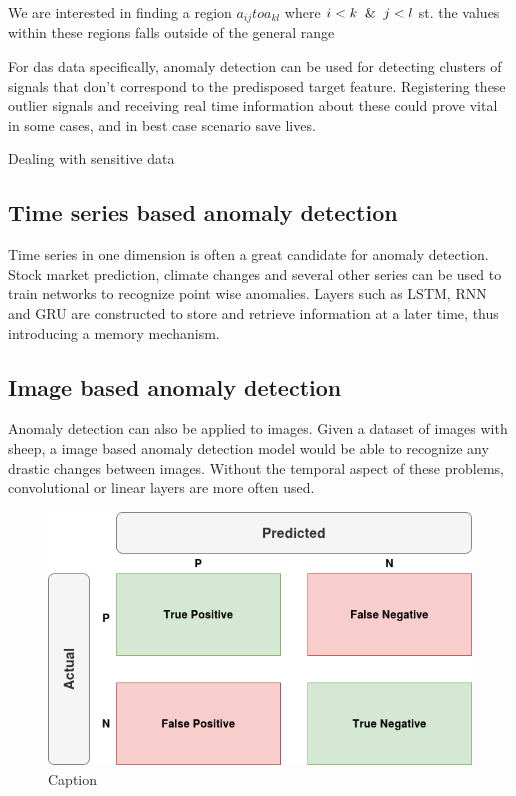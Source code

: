 We are interested in finding a region $a_{ij} to a_{kl}$ where $i < k \And j < l$ st. the values within these regions falls outside of the general range


For \acrshort{das} data specifically, anomaly detection can be used for detecting clusters of signals that don't correspond to the predisposed target feature. Registering these outlier signals and receiving real time information about these could prove vital in some cases,  and in best case scenario save lives. 

Dealing with sensitive data 

\subsection{Time series based anomaly detection}

Time series in one dimension is often a great candidate for anomaly detection. Stock market prediction, climate changes and several other series can be used to train networks to recognize point wise anomalies. Layers such as LSTM, RNN and GRU are constructed to store and retrieve information at a later time, thus introducing a memory mechanism. 

\subsection{Image based anomaly detection}

Anomaly detection can also be applied to images. Given a dataset of images with sheep, a image based anomaly detection model would be able to recognize any drastic changes between images. Without the temporal aspect of these problems, convolutional or linear layers are more often used. 

\begin{figure}[!h]
    \centering
    \includegraphics[width=0.5\linewidth]{figures/confmat.png}
    \caption{Caption}
    \label{fig:confmat}
\end{figure}
